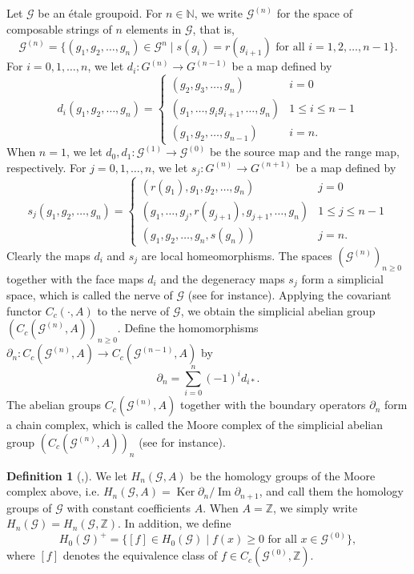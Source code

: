 \documentclass[11pt]{article}
\theoremstyle{definition}
\newtheorem{definition}[theorem]{Definition}
\numberwithin{equation}{section}
\newcommand{\Ima}{\operatorname{Im}}
\newcommand{\Ker}{\operatorname{Ker}}
\newcommand{\G}{\mathcal{G}}
\newcommand{\N}{\mathbb{N}}
\newcommand{\Z}{\mathbb{Z}}
\begin{document}
Let $\G$ be an \'etale groupoid. 
For $n\in\N$, we write $\G^{(n)}$ 
for the space of composable strings of $n$ elements in $\G$, that is, 
\[
\G^{(n)}=\{(g_1,g_2,\dots,g_n)\in\G^n\mid
s(g_i)=r(g_{i+1})\text{ for all }i=1,2,\dots,n{-}1\}. 
\]
For $i=0,1,\dots,n$, 
we let $d_i:G^{(n)}\to G^{(n-1)}$ be a map defined by 
\[
d_i(g_1,g_2,\dots,g_n)=\begin{cases}
(g_2,g_3,\dots,g_n) & i=0 \\
(g_1,\dots,g_ig_{i+1},\dots,g_n) & 1\leq i\leq n{-}1 \\
(g_1,g_2,\dots,g_{n-1}) & i=n. 
\end{cases}
\]
When $n=1$, we let $d_0,d_1:\G^{(1)}\to\G^{(0)}$ be 
the source map and the range map, respectively. 
For $j=0,1,\dots,n$, 
we let $s_j:G^{(n)}\to G^{(n+1)}$ be a map defined by 
\[
s_j(g_1,g_2,\dots,g_n)=\begin{cases}
(r(g_1),g_1,g_2,\dots,g_n) & j=0 \\
(g_1,\dots,g_j,r(g_{j+1}),g_{j+1},\dots,g_n) & 1\leq j\leq n{-}1 \\
(g_1,g_2,\dots,g_n,s(g_n)) & j=n. 
\end{cases}
\]
Clearly the maps $d_i$ and $s_j$ are local homeomorphisms. 
The spaces $(\G^{(n)})_{n\geq0}$ 
together with the face maps $d_i$ and the degeneracy maps $s_j$ 
form a simplicial space, 
which is called the nerve of $\G$ 
(see \cite[Example I.1.4]{GJtext} for instance). 
Applying the covariant functor $C_c(\cdot,A)$ to the nerve of $\G$, 
we obtain the simplicial abelian group $(C_c(\G^{(n)},A))_{n\geq0}$. 
Define the homomorphisms $\partial_n:C_c(\G^{(n)},A)\to C_c(\G^{(n-1)},A)$ 
by 
\[
\partial_n=\sum_{i=0}^n(-1)^id_{i*}. 
\]
The abelian groups $C_c(\G^{(n)},A)$ 
together with the boundary operators $\partial_n$ form a chain complex, 
which is called the Moore complex of 
the simplicial abelian group $(C_c(\G^{(n)},A))_n$ 
(see \cite[Chapter III.2]{GJtext} for instance). 

\begin{definition}
[{\cite[Section 3.1]{CM00crelle},\cite[Definition 3.1]{M12PLMS}}]
\label{homology}
We let $H_n(\G,A)$ be the homology groups of the Moore complex above, 
i.e. $H_n(\G,A)=\Ker\partial_n/\Ima\partial_{n+1}$, 
and call them the homology groups of $\G$ with constant coefficients $A$. 
When $A=\Z$, we simply write $H_n(\G)=H_n(\G,\Z)$. 
In addition, we define 
\[
H_0(\G)^+=\{[f]\in H_0(\G)\mid f(x)\geq0\text{ for all }x\in\G^{(0)}\}, 
\]
where $[f]$ denotes the equivalence class of $f\in C_c(\G^{(0)},\Z)$. 
\end{definition}
\end{document}
